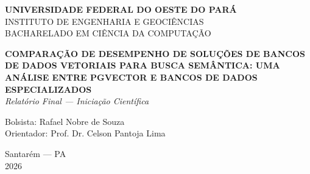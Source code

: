 \documentclass[12pt,a4paper]{article}
\begin{document}
\thispagestyle{empty}
\begin{center}
    {\textbf{UNIVERSIDADE FEDERAL DO OESTE DO PARÁ}}\\[2pt]
    INSTITUTO DE ENGENHARIA E GEOCIÊNCIAS\\[2pt]
    BACHARELADO EM CIÊNCIA DA COMPUTAÇÃO\\
    \vspace{4cm}

    {\large\textbf{COMPARAÇÃO DE DESEMPENHO DE SOLUÇÕES DE BANCOS DE DADOS VETORIAIS PARA BUSCA SEMÂNTICA: UMA ANÁLISE ENTRE PGVECTOR E BANCOS DE DADOS ESPECIALIZADOS}}\\
    \vspace{1cm}
    \textit{Relatório Final --- Iniciação Científica}\\
    \vspace{3cm}

    \begin{flushleft}
        \hspace{6cm}Bolsista: Rafael Nobre de Souza\\
        \hspace{6cm}Orientador: Prof. Dr. Celson Pantoja Lima
    \end{flushleft}

    \vfill
    Santarém --- PA\\
    2026
\end{center}
\newpage














\end{document}
